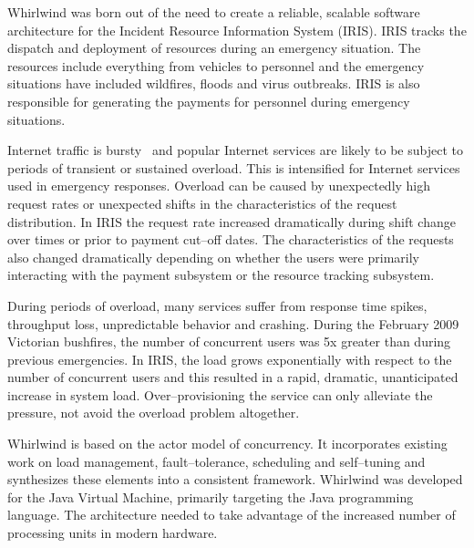 \documentclass[conference]{IEEEtran}
\begin{document}
Whirlwind was born out of the need to create a reliable, scalable software architecture for the Incident Resource Information System (IRIS). IRIS tracks the dispatch and deployment of resources during an emergency situation. The resources include everything from vehicles to personnel and the emergency situations have included wildfires, floods and virus outbreaks. IRIS is also responsible for generating the payments for personnel during emergency situations.


Internet traffic is bursty~\cite{Crovella:1996:BurstyTraffic} and popular Internet services are likely to be subject to periods of transient or sustained overload. This is intensified for Internet services used in emergency responses. Overload can be caused by unexpectedly high request rates or unexpected shifts in the characteristics of the request distribution. In IRIS the request rate increased dramatically during shift change over times or prior to payment cut--off dates. The characteristics of the requests also changed dramatically depending on whether the users were primarily interacting with the payment subsystem or the resource tracking subsystem.

During periods of overload, many services suffer from response time spikes, throughput loss, unpredictable behavior and crashing. During the February 2009 Victorian bushfires, the number of concurrent users was 5x greater than during previous emergencies. In IRIS, the load grows exponentially with respect to the number of concurrent users and this resulted in a rapid, dramatic, unanticipated increase in system load. Over--provisioning the service can only alleviate the pressure, not avoid the overload problem altogether. 
 
Whirlwind is based on the actor model of concurrency. It incorporates existing work on load management, fault--tolerance, scheduling and self--tuning and synthesizes these elements into a consistent framework. Whirlwind was developed for the Java Virtual Machine, primarily targeting the Java programming language. The architecture needed to take advantage of the increased number of processing units in modern hardware.
\end{document}
